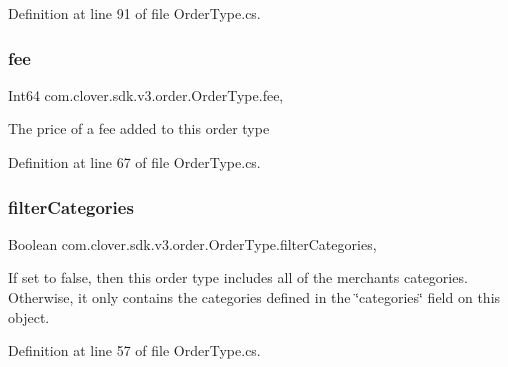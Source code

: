 Definition at line 91 of file Order\+Type.\+cs.

\mbox{\label{classcom_1_1clover_1_1sdk_1_1v3_1_1order_1_1_order_type_a5cc31266e2cb7a7030a4afb75e92c66b}} 
\subsubsection{\texorpdfstring{fee}{fee}}
{\footnotesize\ttfamily Int64 com.\+clover.\+sdk.\+v3.\+order.\+Order\+Type.\+fee\hspace{0.3cm}{\ttfamily [get]}, {\ttfamily [set]}}



The price of a fee added to this order type 



Definition at line 67 of file Order\+Type.\+cs.

\mbox{\label{classcom_1_1clover_1_1sdk_1_1v3_1_1order_1_1_order_type_a331b93bc9bc80f2977df7f28a67dd1e2}} 
\subsubsection{\texorpdfstring{filter\+Categories}{filterCategories}}
{\footnotesize\ttfamily Boolean com.\+clover.\+sdk.\+v3.\+order.\+Order\+Type.\+filter\+Categories\hspace{0.3cm}{\ttfamily [get]}, {\ttfamily [set]}}



If set to false, then this order type includes all of the merchant\textquotesingle{}s categories. Otherwise, it only contains the categories defined in the \char`\"{}categories\char`\"{} field on this object. 



Definition at line 57 of file Order\+Type.\+cs.

